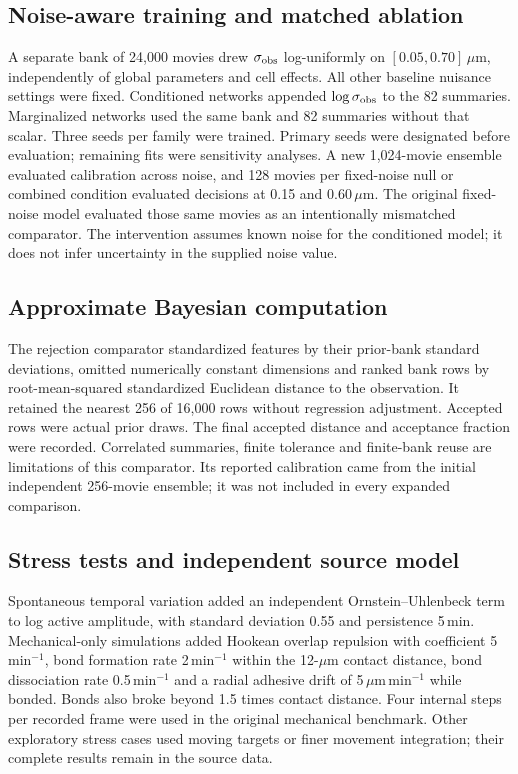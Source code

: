 \documentclass[12pt]{article}
\begin{document}
\subsection*{Noise-aware training and matched ablation}
A separate bank of 24,000 movies drew $\sigma_{\rm obs}$ log-uniformly on $[0.05,0.70]\,\mu$m, independently of global parameters and cell effects. All other baseline nuisance settings were fixed. Conditioned networks appended $\log\sigma_{\rm obs}$ to the 82 summaries. Marginalized networks used the same bank and 82 summaries without that scalar. Three seeds per family were trained. Primary seeds were designated before evaluation; remaining fits were sensitivity analyses. A new 1,024-movie ensemble evaluated calibration across noise, and 128 movies per fixed-noise null or combined condition evaluated decisions at 0.15 and 0.60\,$\mu$m. The original fixed-noise model evaluated those same movies as an intentionally mismatched comparator. The intervention assumes known noise for the conditioned model; it does not infer uncertainty in the supplied noise value.

\subsection*{Approximate Bayesian computation}
The rejection comparator standardized features by their prior-bank standard deviations, omitted numerically constant dimensions and ranked bank rows by root-mean-squared standardized Euclidean distance to the observation. It retained the nearest 256 of 16,000 rows without regression adjustment. Accepted rows were actual prior draws. The final accepted distance and acceptance fraction were recorded. Correlated summaries, finite tolerance and finite-bank reuse are limitations of this comparator. Its reported calibration came from the initial independent 256-movie ensemble; it was not included in every expanded comparison.

\subsection*{Stress tests and independent source model}
Spontaneous temporal variation added an independent Ornstein--Uhlenbeck term to log active amplitude, with standard deviation 0.55 and persistence 5\,min. Mechanical-only simulations added Hookean overlap repulsion with coefficient 5\,min$^{-1}$, bond formation rate 2\,min$^{-1}$ within the 12-$\mu$m contact distance, bond dissociation rate 0.5\,min$^{-1}$ and a radial adhesive drift of 5\,$\mu$m\,min$^{-1}$ while bonded. Bonds also broke beyond 1.5 times contact distance. Four internal steps per recorded frame were used in the original mechanical benchmark. Other exploratory stress cases used moving targets or finer movement integration; their complete results remain in the source data.
\end{document}
